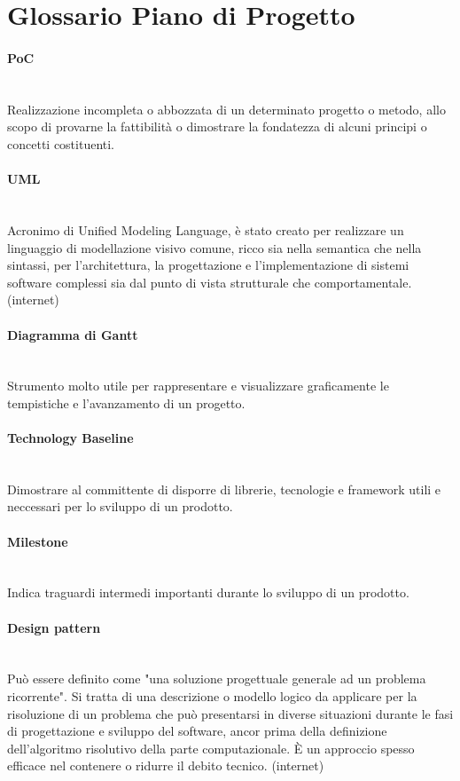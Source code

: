 \section{Glossario Piano di Progetto}

\paragraph{PoC}~\smallskip \\
Realizzazione incompleta o abbozzata di un determinato progetto o metodo, allo scopo di 
provarne la fattibilità o dimostrare la fondatezza di alcuni principi o concetti costituenti.

\paragraph{UML}~\smallskip \\
Acronimo di Unified Modeling Language, è stato creato per realizzare un linguaggio di modellazione visivo comune, ricco 
sia nella semantica che nella sintassi, per l'architettura, la progettazione e l'implementazione di sistemi 
software complessi sia dal punto di vista strutturale che comportamentale. (internet)

\paragraph{Diagramma di Gantt}~\smallskip \\
Strumento molto utile per rappresentare e visualizzare graficamente le tempistiche e l'avanzamento di un progetto.

\paragraph{Technology Baseline}~\smallskip \\
Dimostrare al committente di disporre di librerie, tecnologie e framework utili e neccessari per lo sviluppo di un prodotto.

\paragraph{Milestone}~\smallskip \\
Indica traguardi intermedi importanti durante lo sviluppo di un prodotto.

\paragraph{Design pattern}~\smallskip \\
Può essere definito come "una soluzione progettuale generale ad un problema ricorrente".
Si tratta di una descrizione o modello logico da applicare per la risoluzione di un problema che può 
presentarsi in diverse situazioni durante le fasi di progettazione e sviluppo del software, ancor prima della definizione 
dell'algoritmo risolutivo della parte computazionale. È un approccio spesso efficace nel contenere o ridurre il debito tecnico. (internet)

